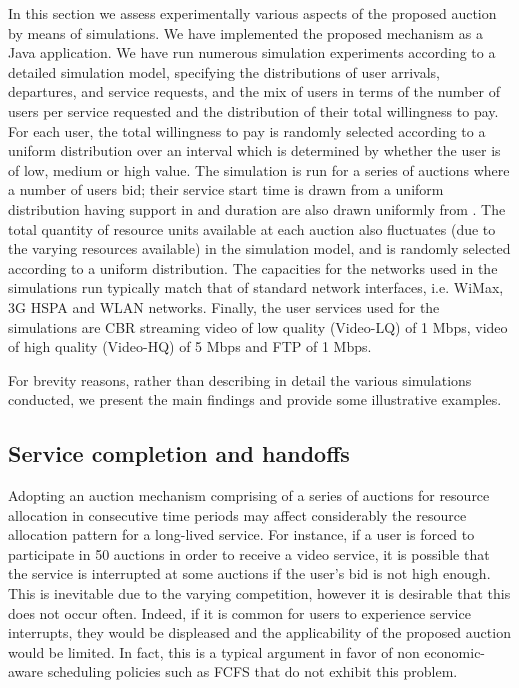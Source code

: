 \documentclass[a4paper]{article}
\begin{document}
In this section we assess experimentally various aspects of the 
proposed auction  by means of simulations. We have implemented
the proposed mechanism as a Java application. 
We have run numerous simulation experiments according to 
a detailed simulation model, specifying the distributions of 
user arrivals, departures, and service requests, and the mix
of users in terms of the number of users per service requested and the
distribution of their total willingness to pay.
For each user, the total willingness to pay is randomly selected according 
to a uniform distribution over an interval which is determined by 
whether the user is of low, medium or high value. 
The simulation is run for a series of  auctions where a
number of users bid; their service start time  is drawn from 
a uniform distribution having support in  and duration
are also drawn uniformly from .
The total quantity of resource units available at 
each auction also fluctuates (due to the varying 
resources available) in the simulation model, 
and is randomly selected according to a uniform distribution. 
The capacities for the networks used in the simulations run typically 
match that of standard network interfaces, i.e. WiMax, 3G HSPA and 
WLAN networks. Finally, the user services used for the simulations
are CBR streaming video of low quality (Video-LQ) of 1 Mbps, video of
high quality (Video-HQ) of 5 Mbps and FTP of 1 Mbps.

For brevity reasons, rather than describing in detail the various simulations
conducted, we present the main findings and provide some illustrative examples.

\subsection{Service completion and handoffs}

Adopting an auction mechanism comprising of a series of auctions for resource
allocation in consecutive time periods may affect considerably the resource
allocation pattern for a long-lived service. For instance, if a user is forced
to participate in 50 auctions in order to receive a video service, it is possible
that the service is interrupted at some auctions if the user's bid is not
high enough. This is inevitable due to the varying competition, however it is
desirable that this does not occur often. Indeed, if it is common for users 
to experience service interrupts, they would be displeased and the applicability
of the proposed auction would be limited. In fact, this is a typical argument
in favor of non economic-aware scheduling policies such as FCFS that do not
exhibit this problem.
\end{document}
